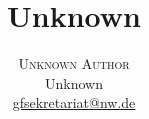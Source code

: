 \documentclass[twoside]{article}
\title{\vspace{-15mm}\fontsize{24pt}{10pt}\selectfont\textbf{Unknown}} %
\author{
\large
\textsc{Unknown Author}\\[2mm] %
\normalsize Unknown \\ %
\normalsize \href{mailto:gfsekretariat@nw.de}{gfsekretariat@nw.de} %
\vspace{-5mm}
}
\date{}
\begin{document}
\maketitle %

\thispagestyle{fancy} %


\begin{abstract}

\begin{center}
    \noindent
\end{center}

\end{abstract}

\end{document}
